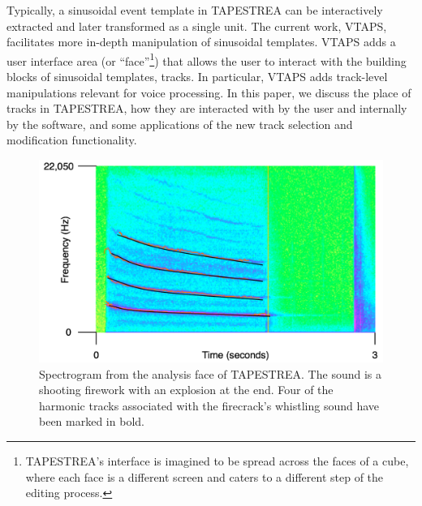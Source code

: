 \documentclass{article}
\begin{document}
Typically, a sinusoidal event template in TAPESTREA can be interactively extracted and later transformed 
as a single unit. The current work, VTAPS, facilitates more in-depth manipulation of sinusoidal templates. VTAPS adds a user interface area (or ``face''\footnote{TAPESTREA's interface is
imagined to be spread across the faces of a cube, where each face is a
different screen and caters to a different step of the editing process.}) that allows the user to 
interact with the building blocks of sinusoidal templates, tracks. In particular, VTAPS adds 
track-level manipulations relevant for voice processing. In this paper, we  
discuss the place of tracks in TAPESTREA, how they are interacted with by the user and 
internally by the software, and some applications of the new track selection and 
modification functionality. 




\begin{figure}
\includegraphics[scale=0.55]{images/spectrogram}
\caption{\label{fig:spectrogram}Spectrogram from the analysis face of
TAPESTREA.  The sound is a shooting firework with an explosion at the end. Four
of the harmonic tracks associated with the firecrack's whistling sound have
been marked in bold.}
\end{figure}
\end{document}
